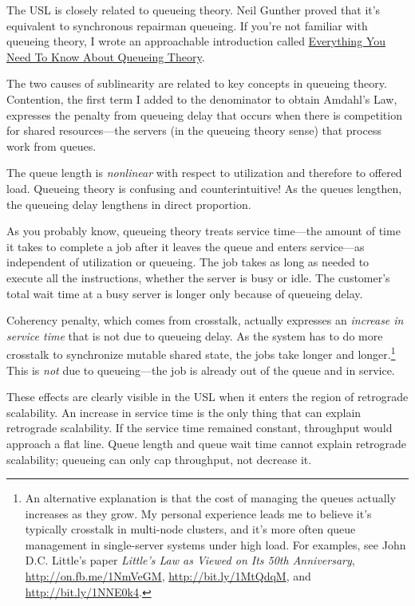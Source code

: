 \documentclass{vivid_layout}
\begin{document}
The USL is closely related to queueing theory. Neil Gunther proved that it's
equivalent to synchronous repairman queueing. If you're not familiar with
queueing theory, I wrote an approachable introduction called
\href{https://www.vividcortex.com/resources/queueing-theory/}{Everything You
Need To Know About Queueing Theory}.

The two causes of sublinearity are related to key concepts in queueing theory.
Contention, the first term I added to the denominator to obtain Amdahl's Law,
expresses the penalty from queueing delay that occurs when there is competition
for shared resources---the servers (in the queueing theory sense) that process
work from queues.

The queue length is {\itshape nonlinear} with respect to utilization and
therefore to offered load. Queueing theory is confusing and counterintuitive! As
the queues lengthen, the queueing delay lengthens in direct proportion.

As you probably know, queueing theory treats service time---the amount of time
it takes to complete a job after it leaves the queue and enters service---as
independent of utilization or queueing. The job takes as long as needed to
execute all the instructions, whether the server is busy or idle. The customer's
total wait time at a busy server is longer only because of queueing delay.

Coherency penalty, which comes from crosstalk, actually expresses an {\itshape
increase in service time} that is not due to queueing delay. As the system has
to do more crosstalk to synchronize mutable shared state, the jobs take longer
and longer.\footnote{An alternative explanation is that the cost of managing the
queues actually increases as they grow. My personal experience leads me to
believe it's typically crosstalk in multi-node clusters, and it's more often
queue management in single-server systems under high load. For examples, see
John D.C. Little's paper {\itshape Little’s Law as Viewed on Its 50th
Anniversary}, \href{http://on.fb.me/1NmVeGM}{http://on.fb.me/1NmVeGM},
\href{http://bit.ly/1MtQdqM}{http://bit.ly/1MtQdqM}, and
\href{http://bit.ly/1NNE0k4}{http://bit.ly/1NNE0k4}.} This is {\itshape not} due
to queueing---the job is already out of the queue and in service.

These effects are clearly visible in the USL when it enters the region of
retrograde scalability. An increase in service time is the only thing that can
explain retrograde scalability. If the service time remained constant,
throughput would approach a flat line. Queue length and queue wait time cannot
explain retrograde scalability; queueing can only cap throughput, not decrease
it.
\end{document}
